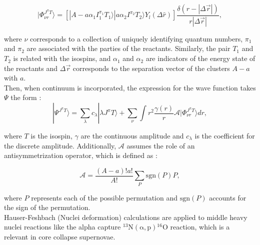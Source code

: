 \documentclass[openany]{book}
\begin{document}
\begin{equation}\label{eq:micro_noCoreShell_basis}
	 | \Phi^{J^{\pi} T}_{\nu r} \rangle  = \left [ |A -a \alpha_1 I^{\pi_1}_1 T_1 \rangle | a \alpha_2  I^{\pi_2} T_2 \rangle  Y_l (\Delta \hat r)\right] \frac{\delta(r - |\Delta \vec r|)}{r  |\Delta \vec r|}, 
\end{equation}

where $\nu$ corresponds to a collection of uniquely identifying quantum numbers, $\pi_1$ and $\pi_2$ are associated with the parties of the reactants. Similarly, the pair  $T_1$ and $T_2$ is related with the isospins, and $\alpha_1$ and $\alpha_2$ are indicators of the energy state of the reactants and  $\Delta \vec r$ corresponds to the separation vector of the clusters $A - a$ with $a$.\\

Then, when continuum is incorporated, the expression for the wave function takes $\Psi$ the form \cite{dohet-eraly_navratil_quaglioni_horiuchi_hupin_raimondi_2016}:  \\



\begin{equation}\label{eq:micro_noCoreShell_continuum}
	| \Psi^{J^{\pi} T} \rangle  = \sum_{\lambda} c_\lambda | \lambda J^{\pi} T \rangle  + \sum_{\nu} { \int {r^2 \frac{\gamma(r)}{r} \hat {\mathcal{A} }  | \Phi^{J^{\pi} T}_{\nu r} \rangle dr} },
\end{equation}

where $T$ is the isospin,  $\gamma$ are the continuous amplitude and $c_\lambda$ is the coefficient for the discrete amplitude. Additionally, $\mathcal{A}$ assumes the role of an antisymmetrization operator, which is defined as \cite{freer_horiuchi_kanada-enyo_lee_meisner_2018}: 

\begin{equation}\label{eq:micro_noCoreShell_antisymmetrization}
	\mathcal{A} = \frac{(A - a)! a!}{A!}  \sum_{P} \mathrm{sgn} (P) P,
\end{equation}

where $P$ represents each of the possible permutation and $\mathrm{sgn}(P)$ accounts for the sign of the permutation. \\ 

Hauser-Feshbach (Nuclei deformation) \cite{jayatissa_avila_rehm_talwar_mohr_auranen_chen_gorelov_hoffman_jiang_et_2022} calculations are applied to middle heavy nuclei reactions like the alpha capture $\mathrm{{}^{13}N(\alpha, p) {}^{16}O}$ reaction, which is a relevant in core collapse supernovae.  \\
\end{document}
